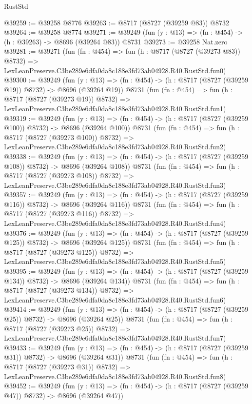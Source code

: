 \begin{lexlean}{RustStd}
\begin{coremodule}
@39259 := @39258 @8776
@39263 := @8717 (@8727 (@39259 @83)) @8732
@39264 := @39258 @8774
@39271 := @39249 (fun (y : @13) => (fn : @454) -> (h : @39263) -> @8696 (@39264 @83)) @8731
@39273 := @39258 Nat.zero
@39281 := @39271
    (fun (fn : @454) =>
    fun (h : @8717 (@8727 (@39273 @83)) @8732) =>
    LexLeanPreserve.C3be289e6dfa0da8c188e3fd73ab04928.R40.RustStd.fun0)
@39300 := @39249
    (fun (y : @13) => (fn : @454) -> (h : @8717 (@8727 (@39259 @19)) @8732) -> @8696 (@39264 @19))
    @8731
    (fun (fn : @454) =>
    fun (h : @8717 (@8727 (@39273 @19)) @8732) =>
    LexLeanPreserve.C3be289e6dfa0da8c188e3fd73ab04928.R40.RustStd.fun1)
@39319 := @39249
    (fun (y : @13) => (fn : @454) -> (h : @8717 (@8727 (@39259 @100)) @8732) -> @8696 (@39264 @100))
    @8731
    (fun (fn : @454) =>
    fun (h : @8717 (@8727 (@39273 @100)) @8732) =>
    LexLeanPreserve.C3be289e6dfa0da8c188e3fd73ab04928.R40.RustStd.fun2)
@39338 := @39249
    (fun (y : @13) => (fn : @454) -> (h : @8717 (@8727 (@39259 @108)) @8732) -> @8696 (@39264 @108))
    @8731
    (fun (fn : @454) =>
    fun (h : @8717 (@8727 (@39273 @108)) @8732) =>
    LexLeanPreserve.C3be289e6dfa0da8c188e3fd73ab04928.R40.RustStd.fun3)
@39357 := @39249
    (fun (y : @13) => (fn : @454) -> (h : @8717 (@8727 (@39259 @116)) @8732) -> @8696 (@39264 @116))
    @8731
    (fun (fn : @454) =>
    fun (h : @8717 (@8727 (@39273 @116)) @8732) =>
    LexLeanPreserve.C3be289e6dfa0da8c188e3fd73ab04928.R40.RustStd.fun4)
@39376 := @39249
    (fun (y : @13) => (fn : @454) -> (h : @8717 (@8727 (@39259 @125)) @8732) -> @8696 (@39264 @125))
    @8731
    (fun (fn : @454) =>
    fun (h : @8717 (@8727 (@39273 @125)) @8732) =>
    LexLeanPreserve.C3be289e6dfa0da8c188e3fd73ab04928.R40.RustStd.fun5)
@39395 := @39249
    (fun (y : @13) => (fn : @454) -> (h : @8717 (@8727 (@39259 @134)) @8732) -> @8696 (@39264 @134))
    @8731
    (fun (fn : @454) =>
    fun (h : @8717 (@8727 (@39273 @134)) @8732) =>
    LexLeanPreserve.C3be289e6dfa0da8c188e3fd73ab04928.R40.RustStd.fun6)
@39414 := @39249
    (fun (y : @13) => (fn : @454) -> (h : @8717 (@8727 (@39259 @25)) @8732) -> @8696 (@39264 @25))
    @8731
    (fun (fn : @454) =>
    fun (h : @8717 (@8727 (@39273 @25)) @8732) =>
    LexLeanPreserve.C3be289e6dfa0da8c188e3fd73ab04928.R40.RustStd.fun7)
@39433 := @39249
    (fun (y : @13) => (fn : @454) -> (h : @8717 (@8727 (@39259 @31)) @8732) -> @8696 (@39264 @31))
    @8731
    (fun (fn : @454) =>
    fun (h : @8717 (@8727 (@39273 @31)) @8732) =>
    LexLeanPreserve.C3be289e6dfa0da8c188e3fd73ab04928.R40.RustStd.fun8)
@39452 := @39249
    (fun (y : @13) => (fn : @454) -> (h : @8717 (@8727 (@39259 @47)) @8732) -> @8696 (@39264 @47))

\end{coremodule}
\end{lexlean}

